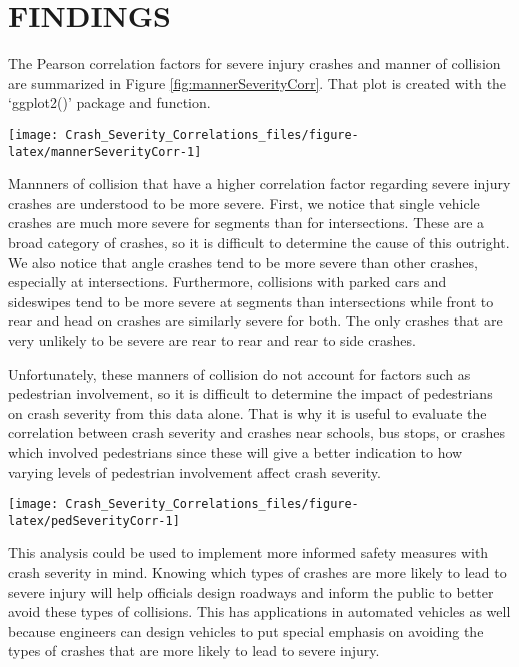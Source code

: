 \documentclass[3p, authoryear]{elsarticle} %
\begin{document}
\hypertarget{findings}{%
\section{FINDINGS}\label{findings}}

The Pearson correlation factors for severe injury crashes and manner of collision are summarized in Figure \ref{fig:mannerSeverityCorr}. That plot is created with the `ggplot2()' package and function.

\begin{center}\texttt{[image: Crash\_Severity\_Correlations\_files/figure-latex/mannerSeverityCorr-1]} \end{center}

Mannners of collision that have a higher correlation factor regarding severe injury crashes are understood to be more severe. First, we notice that single vehicle crashes are much more severe for segments than for intersections. These are a broad category of crashes, so it is difficult to determine the cause of this outright. We also notice that angle crashes tend to be more severe than other crashes, especially at intersections. Furthermore, collisions with parked cars and sideswipes tend to be more severe at segments than intersections while front to rear and head on crashes are similarly severe for both. The only crashes that are very unlikely to be severe are rear to rear and rear to side crashes.

Unfortunately, these manners of collision do not account for factors such as pedestrian involvement, so it is difficult to determine the impact of pedestrians on crash severity from this data alone. That is why it is useful to evaluate the correlation between crash severity and crashes near schools, bus stops, or crashes which involved pedestrians since these will give a better indication to how varying levels of pedestrian involvement affect crash severity.

\begin{center}\texttt{[image: Crash\_Severity\_Correlations\_files/figure-latex/pedSeverityCorr-1]} \end{center}

This analysis could be used to implement more informed safety measures with crash severity in mind. Knowing which types of crashes are more likely to lead to severe injury will help officials design roadways and inform the public to better avoid these types of collisions. This has applications in automated vehicles as well because engineers can design vehicles to put special emphasis on avoiding the types of crashes that are more likely to lead to severe injury.


\end{document}
